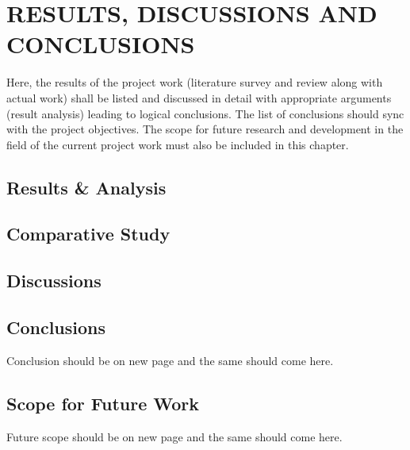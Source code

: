  \chapter{RESULTS, DISCUSSIONS AND CONCLUSIONS} %
\label{ChapterResults} %

Here, the results of the project work (literature survey and review along with actual work) shall be listed and discussed in detail with appropriate arguments (result analysis) leading to logical conclusions. The list of conclusions should sync with the project objectives. The scope for future research and development in the field of the current project work must also be included in this chapter. 

\section{Results \& Analysis}

\section{Comparative Study}

\section{Discussions}


\section{Conclusions}
Conclusion should be on new page and the same should come here.


\section{Scope for Future Work}
Future scope should be on new page and the same should come here.



	
	






